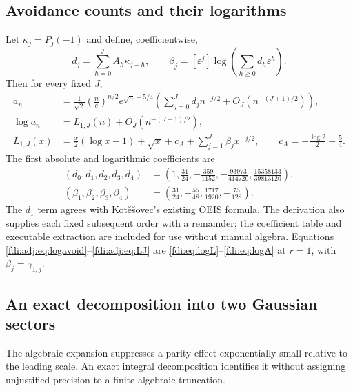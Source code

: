 \documentclass[11pt,letterpaper]{article}
\theoremstyle{remark}\newtheorem{remark}[theorem]{Remark}
\newcommand{\eps}{\varepsilon}\newcommand{\Pois}{\operatorname{Poisson}}
\begin{document}
\subsection{Avoidance counts and their logarithms}\label{fdi:adj:sec:avoid}
Let $\kappa_j=P_j(-1)$ and define, coefficientwise,
\[
 d_j=\sum_{h=0}^jA_h\kappa_{j-h},\qquad
 \beta_j=[\eps^j]\log\left(\sum_{h\ge0}d_h\eps^h\right).
\]
Then for every fixed $J$,
\begin{align}
 a_n&=\frac1{\sqrt2}\left(\frac ne\right)^{n/2}e^{\sqrt n-5/4}
 \left(\sum_{j=0}^Jd_jn^{-j/2}+O_J(n^{-(J+1)/2})\right),\label{fdi:adj:eq:absolute}\\
 \log a_n&=L_{1,J}(n)+O_J(n^{-(J+1)/2}),\label{fdi:adj:eq:logavoid}\\
 L_{1,J}(x)&=\frac x2(\log x-1)+\sqrt x+c_A
             +\sum_{j=1}^J\beta_jx^{-j/2},\qquad
 c_A=-\frac{\log2}{2}-\frac54.\label{fdi:adj:eq:LJ}
\end{align}
The first absolute and logarithmic coefficients are
\begin{align*}
 (d_0,d_1,d_2,d_3,d_4)
 &=\left(1,\frac{31}{24},-\frac{359}{1152},-\frac{93973}{414720},
               \frac{15358133}{39813120}\right),\\
 (\beta_1,\beta_2,\beta_3,\beta_4)
 &=\left(\frac{31}{24},-\frac{55}{48},\frac{1717}{1920},-\frac{75}{128}\right).
\end{align*}
The $d_1$ term agrees with Kot\v{e}\v{s}ovec's existing OEIS formula. The derivation also supplies each fixed subsequent order with a remainder; the coefficient table and executable extraction are included for use without manual algebra. Equations \eqref{fdi:adj:eq:logavoid}--\eqref{fdi:adj:eq:LJ} are \eqref{fdi:eq:logL}--\eqref{fdi:eq:logA} at $r=1$, with $\beta_j=\gamma_{1,j}$.

\subsection{An exact decomposition into two Gaussian sectors}\label{fdi:adj:sec:sectors}
The algebraic expansion suppresses a parity effect exponentially small relative to the leading scale. An exact integral decomposition identifies it without assigning unjustified precision to a finite algebraic truncation.
\end{document}
